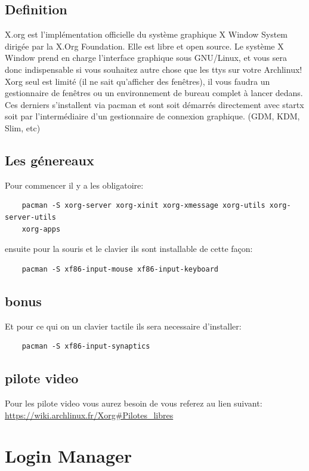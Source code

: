 \documentclass[a4paper]{book}
\begin{document}
  \section{Definition}
  X.org est l'implémentation officielle du système graphique X Window System 
  dirigée par la X.Org Foundation. Elle est libre et open source. Le système X 
  Window prend en charge l'interface graphique sous GNU/Linux, et vous sera donc
  indispensable si vous souhaitez autre chose que les ttys sur votre Archlinux!
  \\
  Xorg seul est limité (il ne sait qu'afficher des fenêtres), il vous faudra un 
  gestionnaire de fenêtres ou un environnement de bureau complet à lancer dedans.
  \\
  Ces derniers s'installent via pacman et sont soit démarrés directement avec 
  startx soit par l’intermédiaire d’un gestionnaire de connexion graphique. 
  (GDM, KDM, Slim, etc)
  \section{Les g\'enereaux}
  Pour commencer il y a les obligatoire\@:\\
  \begin{lstlisting}
    pacman -S xorg-server xorg-xinit xorg-xmessage xorg-utils xorg-server-utils
    xorg-apps
  \end{lstlisting}
  ensuite pour la souris et le clavier ils sont installable de cette façon\@:\\
  \begin{lstlisting}
    pacman -S xf86-input-mouse xf86-input-keyboard
  \end{lstlisting}
  \section{bonus}
  Et pour ce qui on un clavier tactile ils sera necessaire d'installer\@:\\
  \begin{lstlisting}
    pacman -S xf86-input-synaptics
  \end{lstlisting}
  \section{pilote video}
  Pour les pilote video vous aurez besoin de vous referez au lien suivant\@:
  \url{https://wiki.archlinux.fr/Xorg#Pilotes_libres}
  \chapter{Login Manager}
\end{document}
